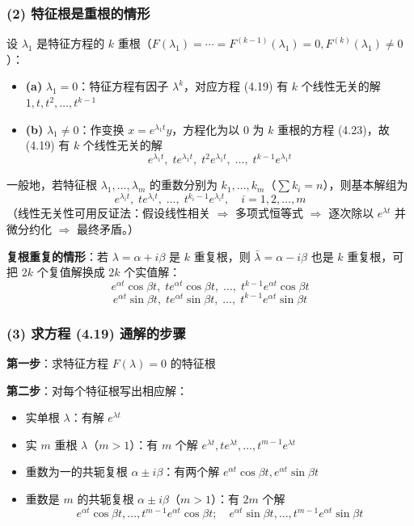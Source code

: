 \subsubsection{(2) 特征根是重根的情形}

设 $\lambda_1$ 是特征方程的 $k$ 重根（$F(\lambda_1) = \cdots = F^{(k-1)}(\lambda_1) = 0, F^{(k)}(\lambda_1) \neq 0$）：

\begin{itemize}
    \item \textbf{(a)} $\lambda_1 = 0$：特征方程有因子 $\lambda^k$，对应方程 (4.19) 有 $k$ 个线性无关的解 $1, t, t^2, \ldots, t^{k-1}$
    \item \textbf{(b)} $\lambda_1 \neq 0$：作变换 $x = e^{\lambda_1 t}y$，方程化为以 0 为 $k$ 重根的方程 (4.23)，故 (4.19) 有 $k$ 个线性无关的解
    \begin{equation}e^{\lambda_1 t}, \; te^{\lambda_1 t}, \; t^2e^{\lambda_1 t}, \; \ldots, \; t^{k-1}e^{\lambda_1 t} \tag{4.25}\end{equation}
\end{itemize}

一般地，若特征根 $\lambda_1, \ldots, \lambda_m$ 的重数分别为 $k_1, \ldots, k_m$（$\sum k_i = n$），则基本解组为
\begin{equation}e^{\lambda_i t}, \; te^{\lambda_i t}, \; \ldots, \; t^{k_i - 1}e^{\lambda_i t}, \quad i = 1, 2, \ldots, m \tag{4.26}\end{equation}
（线性无关性可用反证法：假设线性相关 $\Rightarrow$ 多项式恒等式 $\Rightarrow$ 逐次除以 $e^{\lambda t}$ 并微分约化 $\Rightarrow$ 最终矛盾。）

\textbf{复根重复的情形}：若 $\lambda = \alpha + i\beta$ 是 $k$ 重复根，则 $\bar{\lambda} = \alpha - i\beta$ 也是 $k$ 重复根，可把 $2k$ 个复值解换成 $2k$ 个实值解：
$$e^{\alpha t}\cos\beta t, \; te^{\alpha t}\cos\beta t, \; \ldots, \; t^{k-1}e^{\alpha t}\cos\beta t$$
$$e^{\alpha t}\sin\beta t, \; te^{\alpha t}\sin\beta t, \; \ldots, \; t^{k-1}e^{\alpha t}\sin\beta t$$

\subsubsection{(3) 求方程 (4.19) 通解的步骤}

\textbf{第一步}：求特征方程 $F(\lambda) = 0$ 的特征根

\textbf{第二步}：对每个特征根写出相应解：
\begin{itemize}
    \item[(a)] 实单根 $\lambda$：有解 $e^{\lambda t}$
    \item[(b)] 实 $m$ 重根 $\lambda$（$m > 1$）：有 $m$ 个解 $e^{\lambda t}, te^{\lambda t}, \ldots, t^{m-1}e^{\lambda t}$
    \item[(c)] 重数为一的共轭复根 $\alpha \pm i\beta$：有两个解 $e^{\alpha t}\cos\beta t, e^{\alpha t}\sin\beta t$
    \item[(d)] 重数是 $m$ 的共轭复根 $\alpha \pm i\beta$（$m > 1$）：有 $2m$ 个解
    $$e^{\alpha t}\cos\beta t, \ldots, t^{m-1}e^{\alpha t}\cos\beta t; \quad e^{\alpha t}\sin\beta t, \ldots, t^{m-1}e^{\alpha t}\sin\beta t$$
\end{itemize}

